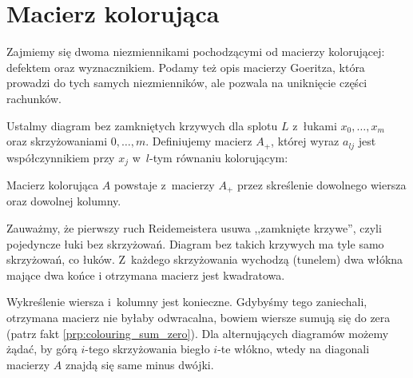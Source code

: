 
\section{Macierz kolorująca}
%
Zajmiemy się dwoma niezmiennikami pochodzącymi od macierzy kolorującej: defektem oraz wyznacznikiem.
Podamy też opis macierzy Goeritza, która prowadzi do tych samych niezmienników, ale pozwala na uniknięcie części rachunków.

\begin{definition}
    Ustalmy diagram bez zamkniętych krzywych dla splotu $L$ z~łukami $x_0, \ldots, x_m$ oraz skrzyżowaniami $0, \ldots, m$.
    Definiujemy macierz $A_+$, której wyraz $a_{lj}$ jest współczynnikiem przy $x_j$ w~$l$-tym równaniu kolorującym:
\begin{center}
\begin{comment}
    \LargePlusCrossingMatrix
\end{comment}
\end{center}
    Macierz kolorująca $A$ powstaje z~macierzy $A_+$ przez skreślenie dowolnego wiersza oraz dowolnej kolumny.
\end{definition}

Zauważmy, że pierwszy ruch Reidemeistera usuwa ,,zamknięte krzywe'', czyli pojedyncze łuki bez skrzyżowań.
Diagram bez takich krzywych ma tyle samo skrzyżowań, co łuków.
Z~każdego skrzyżowania wychodzą (tunelem) dwa włókna mające dwa końce i otrzymana macierz jest kwadratowa.

Wykreślenie wiersza i~kolumny jest konieczne.
Gdybyśmy tego zaniechali, otrzymana macierz nie byłaby odwracalna, bowiem wiersze sumują się do zera (patrz fakt \ref{prp:colouring_sum_zero}).
Dla alternujących diagramów możemy żądać, by górą $i$-tego skrzyżowania biegło $i$-te włókno, wtedy na diagonali macierzy $A$ znajdą się same minus dwójki.









